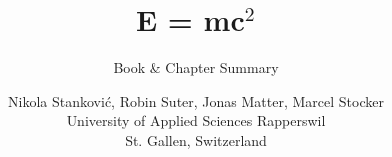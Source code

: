 \documentclass[a4paper,12pt]{scrreprt}
\newcommand{\documentauthors}{Nikola Stanković, Robin Suter, Jonas Matter, Marcel Stocker}
\newcommand{\documenttitel}{E = mc$^2$}
\newcommand{\documentsubtitel}{Book \& Chapter Summary}
\begin{document}
\author{\documentauthors \\ University of Applied Sciences Rapperswil \\ St. Gallen, Switzerland}

\title{\documenttitel}
\subtitle{\documentsubtitel}
\maketitle
\tableofcontents








\end{document}
